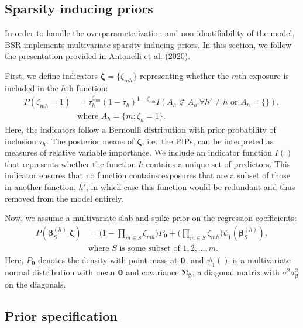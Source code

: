 \documentclass[12pt, twoside]{amherstthesis}
\begin{document}
\hypertarget{sparsity-inducing-priors}{%
\subsection{Sparsity inducing priors}\label{sparsity-inducing-priors}}

In order to handle the overparameterization and non-identifiability of the model, BSR implements multivariate sparsity inducing priors. In this section, we follow the presentation provided in Antonelli et al. (\protect\hyperlink{ref-antonelli_estimating_2020}{2020}).

First, we define indicators \(\boldsymbol\zeta=\{\zeta_{mh}\}\) representing whether the \(m\)th exposure is included in the \(h\)th function:
\begin{align*}
P(\zeta_{mh}=1) &= \tau_h^{\zeta_{mh}}(1-\tau_h)^{1-\zeta_{mh}} 
I(A_h\not\subset A_{h'}\forall h'\neq h \textrm{ or } A_h=\{\}),\\
&\textrm{where } A_h=\{m:\zeta_h=1\}.
\end{align*}
\noindent Here, the indicators follow a Bernoulli distribution with prior probability of inclusion \(\tau_h\). The posterior means of \(\boldsymbol\zeta\), i.e.~the PIPs, can be interpreted as measures of relative variable importance. We include an indicator function \(I()\) that represents whether the function \(h\) contains a unique set of predictors. This indicator ensures that no function contains exposures that are a subset of those in another function, \(h'\), in which case this function would be redundant and thus removed from the model entirely.

Now, we assume a multivariate slab-and-spike prior on the regression coefficients:
\begin{align*}
P(\boldsymbol\beta_S^{(h)}|\boldsymbol\zeta) &= \bigg(1-\prod_{m\in S}\zeta_{mh}\bigg)P_{\textbf{0}} +
\bigg(\prod_{m\in S}\zeta_{mh}\bigg) \psi_1(\boldsymbol\beta_S^{(h)}), \\
&\textrm{where } S \textrm{ is some subset of } {1, 2, \dots, m}.
\end{align*}
\noindent Here, \(P_{\textbf{0}}\) denotes the density with point mass at \(\textbf0\), and \(\psi_1()\) is a multivariate normal distribution with mean \(\textbf0\) and covariance \(\boldsymbol\Sigma_{\boldsymbol\beta}\), a diagonal matrix with \(\sigma^2\sigma_{\boldsymbol\beta}^2\) on the diagonals.

\hypertarget{bsrprior}{%
\subsection{Prior specification}\label{bsrprior}}
\end{document}
